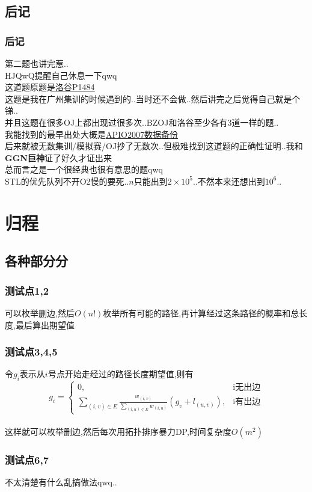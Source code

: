 \documentclass{beamer}
\begin{document}
		\subsection{后记}
			\begin{frame}\frametitle{后记}
				第二题也讲完惹..\\
				HJQwQ提醒自己休息一下qwq\\
				这道题原题是\underline{\href{https://www.luogu.com.cn/problem/P1484}{洛谷P1484}}\\
				这题是我在广州集训的时候遇到的..当时还不会做..然后讲完之后觉得自己就是个锑..\\
				并且这题在很多OJ上都出现过很多次..BZOJ和洛谷至少各有3道一样的题..\\
				我能找到的最早出处大概是\underline{\href{https://www.luogu.com.cn/problem/P3620}{APIO2007数据备份}}\\
				后来就被无数集训/模拟赛/OJ抄了无数次..但极难找到这道题的正确性证明..我和\textbf{GGN巨神}证了好久才证出来\\
				总而言之是一个很经典也很有意思的题qwq\\
				STL的优先队列不开O2慢的要死..$n$只能出到$2\times10^5$..不然本来还想出到$10^6$..
			\end{frame}
	\section{归程}
		\subsection{各种部分分}
			\begin{frame}\frametitle{测试点1,2}
				可以枚举删边,然后$O(n!)$枚举所有可能的路径,再计算经过这条路径的概率和总长度,最后算出期望值\\
			\end{frame}
			\begin{frame}\frametitle{测试点3,4,5}
				令$g_i$表示从$i$号点开始走经过的路径长度期望值,则有\\
				$$g_i=\begin{cases}
					0,&\mbox{i无出边}\\
					\sum\limits_{(i,v)\in E}\frac{w_{(i,v)}}{\sum\limits_{(i,u)\in E}w_{(i,u)}}(g_v+l_{(u,v)}),&\mbox{i有出边}
				\end{cases}$$\\
				这样就可以枚举删边,然后每次用拓扑排序暴力DP,时间复杂度$O(m^2)$
			\end{frame}
			\begin{frame}\frametitle{测试点6,7}
				不太清楚有什么乱搞做法qwq..
			\end{frame}
\end{document}
